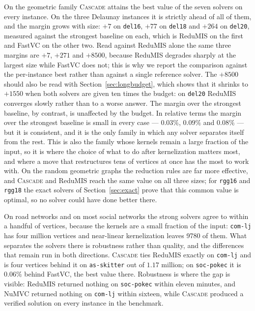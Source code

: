 \documentclass[preprint,12pt]{elsarticle}
\theoremstyle{definition}
\begin{document}
On the geometric family \textsc{Cascade} attains the best value of the seven
solvers on every instance. On the three Delaunay instances it is strictly ahead
of all of them, and the margin grows with size: $+7$ on \texttt{del16}, $+77$ on
\texttt{del18} and $+264$ on \texttt{del20}, measured against the strongest
baseline on each, which is ReduMIS on the first and FastVC on the other two.
Read against ReduMIS alone the same three margins are $+7$, $+271$ and $+8500$,
because ReduMIS degrades sharply at the largest size while FastVC does not; this
is why we report the comparison against the per-instance best rather than
against a single reference solver. The $+8500$ should also be read with
Section~\ref{sec:longbudget}, which shows that it shrinks to $+1550$ when both
solvers are given ten times the budget: on \texttt{del20} ReduMIS converges
slowly rather than to a worse answer. The margin over the strongest baseline,
by contrast, is unaffected by the budget. In relative terms the margin over the
strongest baseline is small in every case --- $0.03\%$, $0.09\%$ and $0.08\%$ ---
but it is consistent, and it is the only family in which any solver separates
itself from the rest. This is also the family whose kernels remain a large
fraction of the input, so it is where the choice of what to do after
kernelization matters most, and where a move that restructures tens of vertices
at once has the most to work with. On the random geometric graphs the reduction
rules are far more effective, and \textsc{Cascade} and ReduMIS reach the same
value on all three sizes; for \texttt{rgg16} and \texttt{rgg18} the exact
solvers of Section~\ref{sec:exact} prove that this common value is optimal, so
no solver could have done better there.

On road networks and on most social networks the strong solvers agree to within
a handful of vertices, because the kernels are a small fraction of the input:
\texttt{com-lj} has four million vertices and near-linear kernelization leaves
9780 of them. What separates the solvers there is robustness rather than
quality, and the differences that remain run in both directions. \textsc{Cascade}
ties ReduMIS exactly on \texttt{com-lj} and is four vertices behind it on
\texttt{as-skitter} out of $1.17$ million; on \texttt{soc-pokec} it is $0.06\%$
behind FastVC, the best value there. Robustness is where the gap is visible:
ReduMIS returned nothing on \texttt{soc-pokec} within eleven minutes, and NuMVC
returned nothing on \texttt{com-lj} within sixteen, while \textsc{Cascade}
produced a verified solution on every instance in the benchmark.
\end{document}
